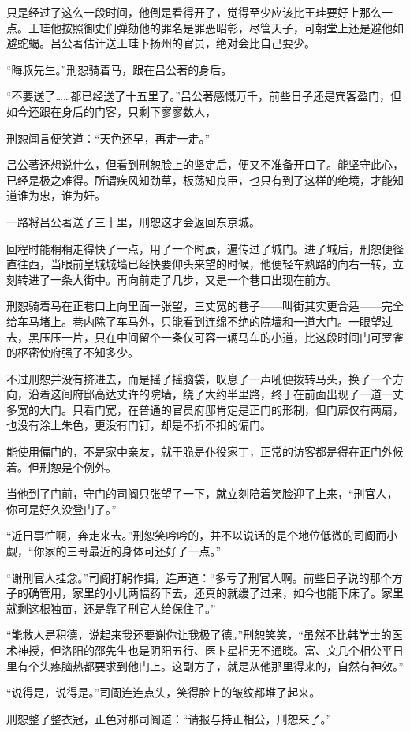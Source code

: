 只是经过了这么一段时间，他倒是看得开了，觉得至少应该比王珪要好上那么一点。王珪他按照御史们弹劾他的罪名是罪恶昭彰，尽管天子，可朝堂上还是避他如避蛇蝎。吕公著估计送王珪下扬州的官员，绝对会比自己要少。

“晦叔先生。”刑恕骑着马，跟在吕公著的身后。

“不要送了……都已经送了十五里了。”吕公著感慨万千，前些日子还是宾客盈门，但如今还跟在身后的门客，只剩下寥寥数人，

刑恕闻言便笑道：“天色还早，再走一走。”

吕公著还想说什么，但看到刑恕脸上的坚定后，便又不准备开口了。能坚守此心，已经是极之难得。所谓疾风知劲草，板荡知良臣，也只有到了这样的绝境，才能知道谁为忠，谁为奸。

一路将吕公著送了三十里，刑恕这才会返回东京城。

回程时能稍稍走得快了一点，用了一个时辰，遍传过了城门。进了城后，刑恕便径直往西，当眼前皇城城墙已经快要仰头来望的时候，他便轻车熟路的向右一转，立刻转进了一条大街中。再向前走了几步，又是一个巷口出现在前方。

刑恕骑着马在正巷口上向里面一张望，三丈宽的巷子——叫街其实更合适——完全给车马堵上。巷内除了车马外，只能看到连绵不绝的院墙和一道大门。一眼望过去，黑压压一片，只在中间留个一条仅可容一辆马车的小道，比这段时间门可罗雀的枢密使府强了不知多少。

不过刑恕并没有挤进去，而是摇了摇脑袋，叹息了一声吼便拨转马头，换了一个方向，沿着这间府邸高达丈许的院墙，绕了大约半里路，终于在前面出现了一道一丈多宽的大门。只看门宽，在普通的官员府邸肯定是正门的形制，但门扉仅有两扇，也没有涂上朱色，更没有门钉，却是不折不扣的偏门。

能使用偏门的，不是家中亲友，就干脆是仆役家丁，正常的访客都是得在正门外候着。但刑恕是个例外。

当他到了门前，守门的司阍只张望了一下，就立刻陪着笑脸迎了上来，“刑官人，你可是好久没登门了。”

“近日事忙啊，奔走来去。”刑恕笑吟吟的，并不以说话的是个地位低微的司阍而小觑，“你家的三哥最近的身体可还好了一点。”

“谢刑官人挂念。”司阍打躬作揖，连声道：“多亏了刑官人啊。前些日子说的那个方子的确管用，家里的小儿两幅药下去，还真的就缓了过来，如今也能下床了。家里就剩这根独苗，还是靠了刑官人给保住了。”

“能救人是积德，说起来我还要谢你让我极了德。”刑恕笑笑，“虽然不比韩学士的医术神授，但洛阳的邵先生也是阴阳五行、医卜星相无不通晓。富、文几个相公平日里有个头疼脑热都要求到他门上。这副方子，就是从他那里得来的，自然有神效。”

“说得是，说得是。”司阍连连点头，笑得脸上的皱纹都堆了起来。

刑恕整了整衣冠，正色对那司阍道：“请报与持正相公，刑恕来了。”

